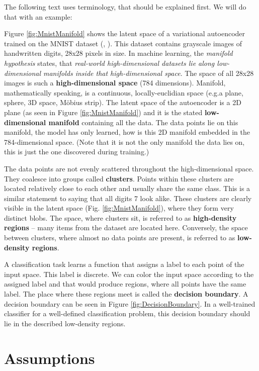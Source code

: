 \qquad

The following text uses terminology, that should be explained first. We will do that with an example:

Figure \ref{fig:MnistManifold} shows the latent space of a variational autoencoder trained on the MNIST dataset (\cite{VariationalAutoencoder}, \cite{Mnist}). This dataset contains grayscale images of handwritten digits, 28x28 pixels in size. In machine learning, the \emph{manifold hypothesis} states, that \emph{real-world high-dimensional datasets lie along low-dimensional manifolds inside that high-dimensional space}. The space of all 28x28 images is such a \textbf{high-dimensional space} (784 dimensions). Manifold, mathematically speaking, is a continuous, locally-euclidian space (e.g.\@ a plane, sphere, 3D space, Möbius strip). The latent space of the autoencoder is a 2D plane (as seen in Figure \ref{fig:MnistManifold}) and it is the stated \textbf{low-dimensional manifold} containing all the data. The data points lie on this manifold, the model has only learned, how is this 2D manifold embedded in the 784-dimensional space. (Note that it is not the only manifold the data lies on, this is just the one discovered during training.)

The data points are not evenly scattered throughout the high-dimensional space. They coalesce into groups called \textbf{clusters}. Points within these clusters are located relatively close to each other and usually share the same class. This is a similar statement to saying that all digits 7 look alike. These clusters are clearly visible in the latent space (Fig. \ref{fig:MnistManifold}), where they form very distinct blobs. The space, where clusters sit, is referred to as \textbf{high-density regions} -- many items from the dataset are located here. Conversely, the space between clusters, where almost no data points are present, is referred to as \textbf{low-density regions}.

A classification task learns a function that assigns a label to each point of the input space. This label is discrete. We can color the input space according to the assigned label and that would produce regions, where all points have the same label. The place where these regions meet is called the \textbf{decision boundary}. A decision boundary can be seen in Figure \ref{fig:DecisionBoundary}. In a well-trained classifier for a well-defined classification problem, this decision boundary should lie in the described low-density regions.


\section{Assumptions}
\label{sec:SslAssumptions}

